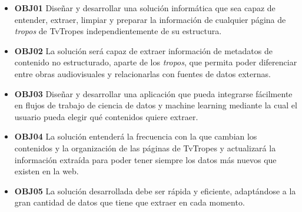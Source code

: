 \begin{itemize}
    \item \textbf{OBJ01} Diseñar y desarrollar una solución informática que sea
    capaz de entender, extraer, limpiar y preparar la información de cualquier
    página de \textit{tropos} de TvTropes independientemente de su estructura.
    \item \textbf{OBJ02} La solución será capaz de extraer información de
    metadatos de contenido no estructurado, aparte de los \textit{tropos}, que
    permita poder diferenciar entre obras audiovisuales y relacionarlas con
    fuentes de datos externas.
    \item \textbf{OBJ03} Diseñar y desarrollar una aplicación que pueda
    integrarse fácilmente en flujos de trabajo de ciencia de datos y machine
    learning mediante la cual el usuario pueda elegir qué contenidos quiere
    extraer.
    \item \textbf{OBJ04} La solución entenderá la frecuencia con la que cambian
    los contenidos y la organización de las páginas de TvTropes y actualizará la
    información extraída para poder tener siempre los datos más nuevos que
    existen en la web.
    \item \textbf{OBJ05} La solución desarrollada debe ser rápida y eficiente,
    adaptándose a la gran cantidad de datos que tiene que extraer en cada
    momento.
\end{itemize}


